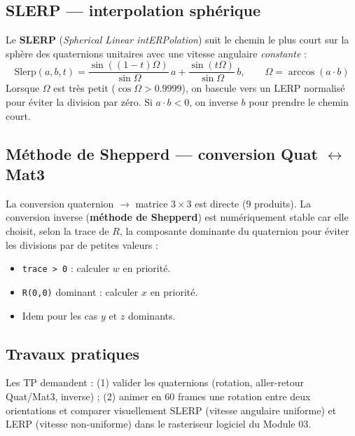 \documentclass[11pt,a4paper]{article}
\begin{document}
\subsection{SLERP — interpolation sphérique}
Le \textbf{SLERP} (\textit{Spherical Linear intERPolation}) suit le chemin le plus court sur la
sphère des quaternions unitaires avec une vitesse angulaire \textit{constante} :
\[
  \text{Slerp}(a, b, t) = \frac{\sin((1-t)\Omega)}{\sin\Omega}\,a + \frac{\sin(t\Omega)}{\sin\Omega}\,b, \qquad \Omega = \arccos(a \cdot b)
\]
Lorsque $\Omega$ est très petit ($\cos\Omega > 0.9999$), on bascule vers un LERP normalisé pour
éviter la division par zéro. Si $a \cdot b < 0$, on inverse $b$ pour prendre le chemin court.

\subsection{Méthode de Shepperd — conversion Quat $\leftrightarrow$ Mat3}
La conversion quaternion $\to$ matrice $3\times3$ est directe (9 produits). La conversion inverse
(\textbf{méthode de Shepperd}) est numériquement stable car elle choisit, selon la trace de $R$,
la composante dominante du quaternion pour éviter les divisions par de petites valeurs :
\begin{itemize}[noitemsep]
  \item \texttt{trace > 0} : calculer $w$ en priorité.
  \item \texttt{R(0,0)} dominant : calculer $x$ en priorité.
  \item Idem pour les cas $y$ et $z$ dominants.
\end{itemize}

\subsection{Travaux pratiques}
Les TP demandent : (1) valider les quaternions (rotation, aller-retour Quat/Mat3, inverse) ;
(2) animer en 60 frames une rotation entre deux orientations et comparer visuellement SLERP
(vitesse angulaire uniforme) et LERP (vitesse non-uniforme) dans le rasteriseur logiciel du Module 03.

\end{document}
